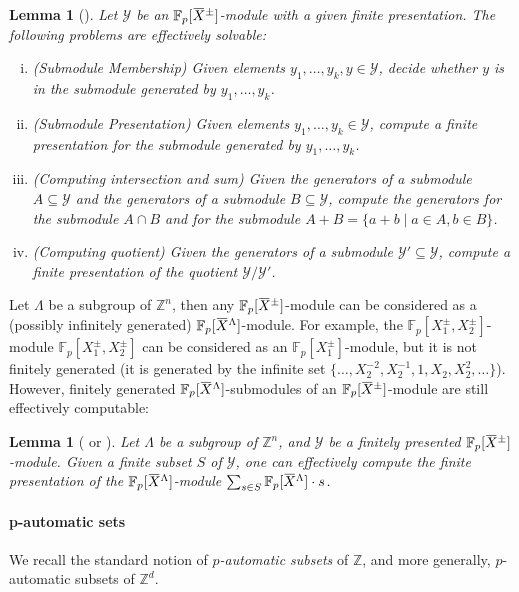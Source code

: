 \documentclass[a4paper,UKenglish,cleveref, autoref, thm-restate]{lipics-v2021}
\newcommand{\Z}{\mathbb{Z}}
\newcommand{\F}{\mathbb{F}}
\newcommand{\mY}{\mathcal{Y}}
\newcommand{\oX}{\mkern 1.5mu\overline{\mkern-1.5mu X \mkern-1.5mu}\mkern 1.5mu}
\newtheorem{lem}[thrm]{Lemma}
\theoremstyle{definition}
\theoremstyle{definition}
\theoremstyle{definition}
\begin{document}
\begin{lem}[{\cite[Lemma~2.1, 2.2]{baumslag1981computable}}]\label{lem:classicdec}
    Let $\mY$ be an $\F_p[\oX^{\pm}]$-module with a given finite presentation.
    The following problems are effectively solvable:
    \begin{enumerate}[(i)]
        \item \textit{(Submodule Membership)} Given elements $y_1, \ldots, y_k, y \in \mY$, decide whether $y$ is in the submodule generated by $y_1, \ldots, y_k$.
        \item \textit{(Submodule Presentation)} Given elements $y_1, \ldots, y_k \in \mY$, compute a finite presentation for the submodule generated by $y_1, \ldots, y_k$.
        \item \textit{(Computing intersection and sum)} Given the generators of a submodule $A \subseteq \mY$ and the generators of a submodule $B \subseteq \mY$, compute the generators for the submodule $A \cap B$ and for the submodule $A + B = \{a + b \mid a \in A, b \in B\}$.
        \item \textit{(Computing quotient)} Given the generators of a submodule $\mY' \subseteq \mY$, compute a finite presentation of the quotient $\mY/\mY'$.
    \end{enumerate}
\end{lem}

Let $\Lambda$ be a subgroup of $\Z^n$, then any $\F_p[\oX^{\pm}]$-module can be considered as a (possibly infinitely generated) $\F_p[\oX^{\Lambda}]$-module. For example, the $\F_p[X_1^{\pm}, X_2^{\pm}]$-module $\F_p[X_1^{\pm}, X_2^{\pm}]$ can be considered as an $\F_p[X_1^{\pm}]$-module, but it is not finitely generated (it is generated by the infinite set $\{\ldots, X_2^{-2}, X_2^{-1}, 1, X_2, X_2^2, \ldots\}$).
However, finitely generated $\F_p[\oX^{\Lambda}]$-submodules of an $\F_p[\oX^{\pm}]$-module are still effectively computable:

\begin{lem}[{\cite[Theorem~2.14]{baumslag1981computable} or \cite[Theorem~2.6]{baumslag1994algorithmic}}]\label{lem:sgmod}
    Let $\Lambda$ be a subgroup of $\Z^n$, and $\mY$ be a finitely presented $\F_p[\oX^{\pm}]$-module.
    Given a finite subset $S$ of $\mY$, one can effectively compute the finite presentation of the $\F_p[\oX^{\Lambda}]$-module $\sum_{s \in S} \F_p[\oX^{\Lambda}] \cdot s$.
\end{lem}

\paragraph*{p-automatic sets}
We recall the standard notion of \emph{$p$-automatic subsets} of $\Z$, and more generally, $p$-automatic subsets of $\Z^d$.
\end{document}
